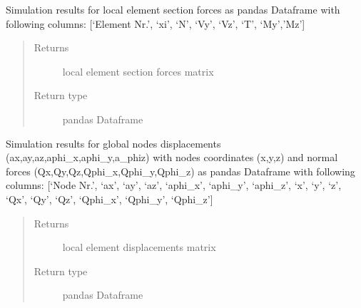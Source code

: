 \documentclass[letterpaper,10pt,english]{sphinxmanual}
\begin{document}
\begin{fulllineitems}
\begin{fulllineitems}
\begin{quote}
\begin{description}
\end{description}\end{quote}

\end{fulllineitems}


\begin{fulllineitems}
\label{\detokenize{api:beamon.simulation.Simulation.local_element_section_forces}}
Simulation results for local element section forces as pandas Dataframe with following columns:
{[}‘Element Nr.’, ‘xi’, ‘N’, ‘Vy’, ‘Vz’, ‘T’, ‘My’,’Mz’{]}
\begin{quote}\begin{description}
\item[{Returns}] \leavevmode
local element section forces matrix

\item[{Return type}] \leavevmode
pandas Dataframe

\end{description}\end{quote}

\end{fulllineitems}


\begin{fulllineitems}
\label{\detokenize{api:beamon.simulation.Simulation.nodes_results}}
Simulation results for global nodes displacements (ax,ay,az,aphi\_x,aphi\_y,a\_phiz) with nodes coordinates
(x,y,z) and normal forces (Qx,Qy,Qz,Qphi\_x,Qphi\_y,Qphi\_z) as pandas Dataframe with following columns:
{[}‘Node Nr.’, ‘ax’, ‘ay’, ‘az’, ‘aphi\_x’, ‘aphi\_y’, ‘aphi\_z’, ‘x’, ‘y’, ‘z’, ‘Qx’, ‘Qy’, ‘Qz’, ‘Qphi\_x’,
‘Qphi\_y’, ‘Qphi\_z’{]}
\begin{quote}\begin{description}
\item[{Returns}] \leavevmode
local element displacements matrix

\item[{Return type}] \leavevmode
pandas Dataframe


\end{description}
\end{quote}
\end{fulllineitems}
\end{fulllineitems}
\end{document}
